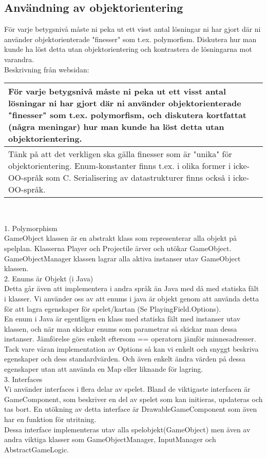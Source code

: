 \subsection{Användning av objektorientering}
{\color{red}För varje betygsnivå måste ni peka ut ett visst antal lösningar ni har gjort där ni använder objektorienterade "finesser" som t.ex. polymorfism.  Diskutera hur man kunde ha löst detta utan objektorientering och kontrastera de lösningarna mot varandra. \\
Beskrivning från websidan:\\
\begin{tabular}{| p{11cm} |}
    \hline
    För varje betygsnivå måste ni peka ut ett visst antal lösningar ni har gjort där ni använder objektorienterade "finesser" som t.ex. polymorfism, och diskutera kortfattat (några meningar) hur man kunde ha löst detta utan objektorientering. \\ \hline
    Tänk på att det verkligen ska gälla finesser som är "unika" för objektorientering. Enum-konstanter finns t.ex. i olika former i icke-OO-språk som C. Serialisering av datastrukturer finns också i icke-OO-språk. \\ \hline
\end{tabular}\\}
\vspace{11pt}
1. Polymorphism\\
GameObject klassen är en abstrakt klass som representerar alla objekt på spelplan. Klasserna Player och Projectile ärver och utökar GameObject.\\
GameObjectManager klassen lagrar alla aktiva instanser utav GameObject klassen.\\
\vspace{11pt}
2. Enums är Objekt (i Java)\\
Detta går även att implementera i andra språk än Java med då med statiska fält i klasser.
Vi använder oss av att enums i java är objekt genom att använda detta för att lagra egenskaper för spelet/kartan (Se PlayingField.Options).\\
En enum i Java är egentligen en klass med statiska fält med instanser utav klassen, och när man skickar enums som parametrar så skickar man dessa instanser. Jämförelse görs enkelt eftersom == operatorn jämför minnesadresser.\\
Tack vare våran implementation av Options så kan vi enkelt och snyggt beskriva egenskaper och dess standardvärden. Och även enkelt ändra värden på dessa egenskaper utan att använda en Map eller liknande för lagring.\\
\vspace{11pt}
3. Interfaces\\
Vi använder interfaces i flera delar av spelet. Bland de viktigaste interfacen är GameComponent, som beskriver en del av spelet som kan initieras, updateras och tas bort. En utökning av detta interface är DrawableGameComponent som även har en funktion för utritning.\\
Dessa interface implementeras utav alla spelobjekt(GameObject) men även av andra viktiga klasser som GameObjectManager, InputManager och AbstractGameLogic.\\
